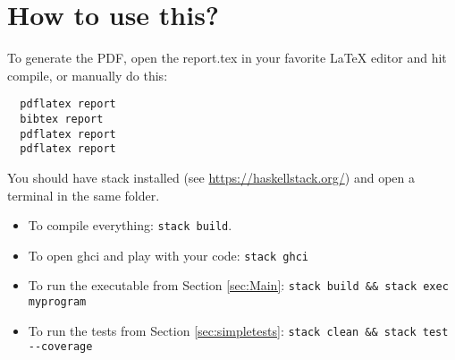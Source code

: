 
\section{How to use this?}

To generate the PDF, open the report.tex in your favorite LaTeX editor and
hit compile, or manually do this:

\begin{verbatim}
  pdflatex report
  bibtex report
  pdflatex report
  pdflatex report
\end{verbatim}

You should have stack installed (see \url{https://haskellstack.org/}) and
open a terminal in the same folder.

\begin{itemize}
  \item To compile everything: \verb|stack build|.
  \item To open ghci and play with your code: \verb|stack ghci|
  \item To run the executable from Section \ref{sec:Main}: \verb|stack build && stack exec myprogram|
  \item To run the tests from Section \ref{sec:simpletests}: \verb|stack clean && stack test --coverage|
\end{itemize}

